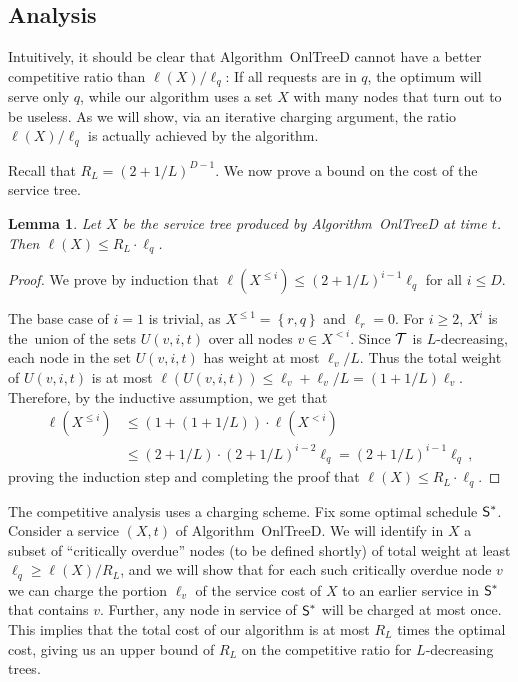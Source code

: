 \documentclass[a4paper]{article}
\newtheorem{lemma}[theorem]{Lemma}
\newcommand{\calT}{{\cal T}}
\newcommand{\braced}[1]{{ \left\{ #1 \right\} }}
\newcommand{\length}{\ell}
\newcommand{\OnAlgTreesDeadlines}{{\sc OnlTreeD}}
\newcommand{\optschedS}{\mbox{\rm\textsf{S}}^\ast}
\begin{document}
\subsection{Analysis}

Intuitively, it should be clear that Algorithm~{\OnAlgTreesDeadlines}
cannot have a better competitive ratio than $\length(X)/\length_q$: If all
requests are in $q$, the optimum will serve only $q$, while our
algorithm uses a set $X$ with many nodes that turn out to be
useless. As we will show, via an iterative charging argument, the ratio
$\length(X)/\length_q$ is actually achieved by the algorithm.

Recall that $R_L = (2+1/L)^{D-1}$.
We now prove a bound on the cost of the service tree.

\begin{lemma}\label{l:d:complete} 
Let $X$ be the service tree produced by
Algorithm~{\OnAlgTreesDeadlines} at time $t$.  Then $\length(X)\leq
R_L\cdot\length_q$.
\end{lemma}

\begin{proof}
We prove by induction that $\length(X^{\leq i}) \leq
(2+1/L)^{i-1}\length_q$ for all $i\leq D$.

The base case of $i=1$ is trivial, as $X^{\le 1}=\braced{r,q}$ and
$\length_r=0$.  For $i\geq 2$, $X^i$ is the~union of the sets $U(v,i,t)$
over all nodes $v \in X^{<i}$. Since $\calT$ is $L$-decreasing, each
node in the set $U(v,i,t)$ has weight at most $\length_v/L$.  Thus
the total weight of $U(v,i,t)$ is at most
$\length(U(v,i,t)) \le \length_v + \length_v/L = (1+1/L)\length_v$.
Therefore, by the inductive assumption, we get that
\begin{align*}
\length(X^{\leq i}) &\leq (1+(1+1/L)) \cdot \length(X^{<i}) 
\\
&\leq (2+1/L)\cdot(2+1/L)^{i-2}\length_q 
= (2+1/L)^{i-1}\length_q\,,
\end{align*}
proving the induction step and completing the proof that 
$\length(X)\leq R_L\cdot\length_q$.
\end{proof}



The competitive analysis uses a charging scheme. Fix some optimal
schedule $\optschedS$. Consider a service $(X,t)$ of
Algorithm~{\OnAlgTreesDeadlines}.  We will identify in $X$ a subset of
``critically overdue'' nodes (to be defined shortly) of total weight
at least $\length_q\geq\length(X)/R_L$, and we will show that for each
such critically overdue node $v$ we can charge the portion $\length_v$
of the service cost of $X$ to an earlier service in $\optschedS$ that
contains $v$.  Further, any node in service of $\optschedS$ will be
charged at most once.  This implies that the total cost of our
algorithm is at most $R_L$ times the optimal cost, giving us an upper
bound of $R_L$ on the competitive ratio for $L$-decreasing trees.
\end{document}
